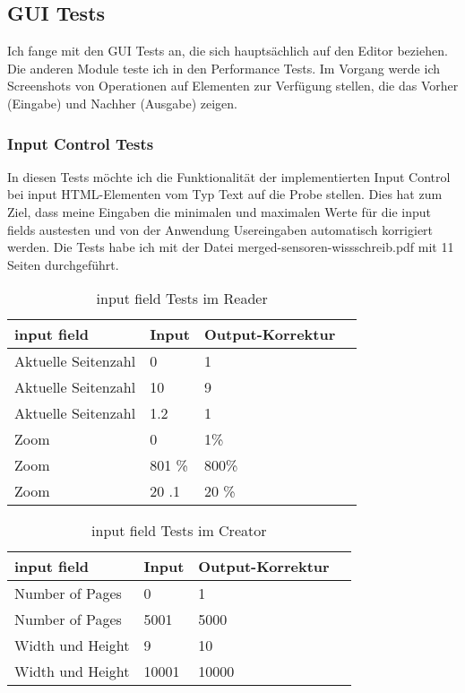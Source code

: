\subsection{GUI Tests}
Ich fange mit den GUI Tests an, die sich hauptsächlich auf den Editor beziehen. Die anderen Module teste ich in den Performance Tests. Im Vorgang werde ich Screenshots von Operationen auf Elementen zur Verfügung stellen, die das Vorher (Eingabe) und Nachher (Ausgabe) zeigen.

\subsubsection{Input Control Tests}
In diesen Tests möchte ich die Funktionalität der implementierten Input Control bei input HTML-Elementen vom Typ Text auf die Probe stellen. Dies hat zum Ziel, dass meine Eingaben die minimalen und maximalen Werte für die input fields austesten und von der Anwendung Usereingaben automatisch korrigiert werden. Die Tests habe ich mit der Datei merged-sensoren-wissschreib.pdf mit 11 Seiten durchgeführt. 

\begin{table}[!htbp]
	\centering
	\begin{tabular}{|p{4cm}|p{3cm}|p{3cm}|p{3cm}|}
		\hline
		\textbf{input field}													& \textbf{Input} 	& \textbf{Output-Korrektur}		\\ 
		\hline
		Aktuelle Seitenzahl												& 0 						& 1		\\ 
		Aktuelle Seitenzahl												& 10 						& 9 					\\ 
		Aktuelle Seitenzahl												& 1.2 						& 1 					\\ 
		Zoom 													& 0						& 1\%  							\\
		Zoom 									& 801 \% 						& 800\% 					\\ 
		Zoom 									& 20 .1 						& 20 \% 					\\ 
		\hline
	\end{tabular}
	\caption{input field Tests im Reader}
	\label{table:reader-input}
\end{table}	

\begin{table}[!htbp]
	\centering
	\begin{tabular}{|p{4cm}|p{3cm}|p{3cm}|p{3cm}|}
		\hline
		\textbf{input field}													& \textbf{Input} 	& \textbf{Output-Korrektur}		\\ 
		\hline
		Number of Pages 							& 0 						& 1 					\\ 
		Number of Pages									& 5001 						& 5000  					\\  
		Width und Height											& 9 						& 10						\\  
		Width und Height			& 10001 						& 10000 						\\  
		\hline
	\end{tabular}
	\caption{input field Tests im Creator}
	\label{table:creator-input}
\end{table}

